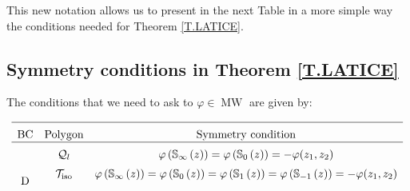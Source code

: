 \documentclass{amsart}
\theoremstyle{definition}
\theoremstyle{remark}
\newcommand{\vp}{\varphi}
\numberwithin{equation}{section}
\theoremstyle{definition}
\theoremstyle{remark}
\DeclareMathOperator\MW{MW}
\begin{document}
This new notation allows us to present in the next Table in a more simple way the conditions needed for Theorem \ref{T.LATICE}.
 \subsection{Symmetry conditions in Theorem \ref{T.LATICE}}
The conditions that we need to ask to $\varphi\in\MW$ are given by:

\begin{center}
\begin{equation}\label{TableB}
		\begin{array}{ccc} 
		\hline
	\rule{0pt}{3.2ex}\mathrm{BC}	& \text{Polygon} &\text{Symmetry condition} \\
		\hline
		\multirow{5}{*}{$\mathrm{D}$} &\rule{0pt}{3.2ex} \mathcal{Q}_l& \vp\left(\mathbb{S}_\infty\left(z\right)\right)=\vp\left(\mathbb{S}_0\left(z\right)\right)=-\vp(z_1,z_2)\\
		& \rule{0pt}{3.2ex}\mathcal{T}_{\mathrm{iso}} & \vp\left(\mathbb{S}_\infty\left(z\right)\right)=\vp\left(\mathbb{S}_0\left(z\right)\right)=\vp\left(\mathbb{S}_1\left(z\right)\right)=\vp\left(\mathbb{S}_{-1}\left(z\right)\right)=-\vp(z_1,z_2) \\
		

\end{array}
\end{equation}
\end{center}
\end{document}
